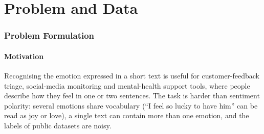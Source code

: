 \documentclass[11pt,a4paper]{article}
\newcommand{\pmstd}[2]{#1\,$\pm$\,#2}
\begin{document}
\begin{abstract}
\noindent
We classify short English texts into six emotions (sadness, joy, love, anger, fear, surprise) using the \texttt{split} configuration of \texttt{dair-ai/emotion}, pinned to one Hugging Face revision. A duplicate audit found 51 repeated-text groups with conflicting labels; after the approved filtering rules the splits contain 15,923 / 1,993 / 2,000 texts with no shared text between them. We compare a TF-IDF + logistic regression baseline (CPU) with full fine-tuning of DistilBERT and BERT (Colab T4), each transformer trained with three seeds. All choices (class weights, text cleaning, checkpoint epoch, final model) were made on validation Macro-F1 with rules fixed in advance; the test set was used once.
On test, the selected model, DistilBERT full fine-tune (seed 42), reaches \textbf{accuracy 0.9270 and Macro-F1 0.8902} (three seeds: \pmstd{0.8861}{0.0038}), against 0.8905 / 0.8548 for the best baseline. The gain holds for all six classes and is largest on long texts, texts with ``but'' and negated texts. BERT is statistically tied with DistilBERT (\pmstd{0.8878}{0.0004}; 62 vs.\ 60 texts that only one of the two gets right) at about twice the cost, and a frozen DistilBERT encoder fails under the same recipe (\pmstd{0.4210}{0.0020}). The baseline is about 45$\times$ faster per text on the same CPU. Error analysis shows that most remaining errors sit between close emotions (joy/love, the negative emotions, fear/surprise) and that part of them point to doubtful labels.
\end{abstract}
\vspace{0.6cm}
\tableofcontents
\clearpage

\part{Problem and Data}

\section{Problem Formulation}

\subsection{Motivation}
Recognising the emotion expressed in a short text is useful for customer-feedback triage, social-media monitoring and mental-health support tools, where people describe how they feel in one or two sentences. The task is harder than sentiment polarity: several emotions share vocabulary (``I feel so lucky to have him'' can be read as joy or love), a single text can contain more than one emotion, and the labels of public datasets are noisy.
\end{document}

